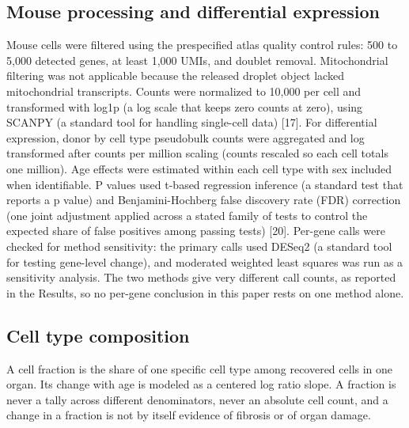\documentclass[11pt]{article}
\begin{document}
\subsection*{Mouse processing and differential expression}

Mouse cells were filtered using the prespecified atlas quality control rules: 500 to 5,000 detected genes, at least 1,000 UMIs, and doublet removal. Mitochondrial filtering was not applicable because the released droplet object lacked mitochondrial transcripts. Counts were normalized to 10,000 per cell and transformed with log1p (a log scale that keeps zero counts at zero), using SCANPY (a standard tool for handling single-cell data) [17]. For differential expression, donor by cell type pseudobulk counts were aggregated and log transformed after counts per million scaling (counts rescaled so each cell totals one million). Age effects were estimated within each cell type with sex included when identifiable. P values used t-based regression inference (a standard test that reports a p value) and Benjamini-Hochberg false discovery rate (FDR) correction (one joint adjustment applied across a stated family of tests to control the expected share of false positives among passing tests) [20]. Per-gene calls were checked for method sensitivity: the primary calls used DESeq2 (a standard tool for testing gene-level change), and moderated weighted least squares was run as a sensitivity analysis. The two methods give very different call counts, as reported in the Results, so no per-gene conclusion in this paper rests on one method alone.

\subsection*{Cell type composition}

A cell fraction is the share of one specific cell type among recovered cells in one organ. Its change with age is modeled as a centered log ratio slope. A fraction is never a tally across different denominators, never an absolute cell count, and a change in a fraction is not by itself evidence of fibrosis or of organ damage.
\end{document}
